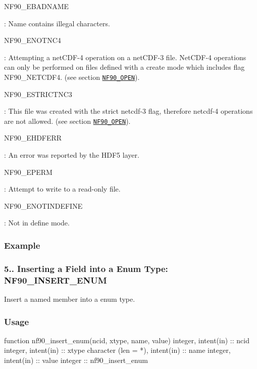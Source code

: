 {\ttfamily N\+F90\+\_\+\+E\+B\+A\+D\+N\+A\+ME}

\+: Name contains illegal characters.

{\ttfamily N\+F90\+\_\+\+E\+N\+O\+T\+N\+C4}

\+: Attempting a net\+C\+D\+F-\/4 operation on a net\+C\+D\+F-\/3 file. Net\+C\+D\+F-\/4 operations can only be performed on files defined with a create mode which includes flag N\+F90\+\_\+\+N\+E\+T\+C\+D\+F4. (see section \href{#NF90_005fOPEN}{\tt N\+F90\+\_\+\+O\+P\+EN}).

{\ttfamily N\+F90\+\_\+\+E\+S\+T\+R\+I\+C\+T\+N\+C3}

\+: This file was created with the strict netcdf-\/3 flag, therefore netcdf-\/4 operations are not allowed. (see section \href{#NF90_005fOPEN}{\tt N\+F90\+\_\+\+O\+P\+EN}).

{\ttfamily N\+F90\+\_\+\+E\+H\+D\+F\+E\+RR}

\+: An error was reported by the H\+D\+F5 layer.

{\ttfamily N\+F90\+\_\+\+E\+P\+E\+RM}

\+: Attempt to write to a read-\/only file.

{\ttfamily N\+F90\+\_\+\+E\+N\+O\+T\+I\+N\+D\+E\+F\+I\+NE}

\+: Not in define mode.

\subsubsection*{Example}\hypertarget{f90-user-defined-data-types_f90-inserting-a-field-into-a-enum-type-nf90_insert_enum}{}\subsubsection{5.. Inserting a Field into a Enum Type\+: N\+F90\+\_\+\+I\+N\+S\+E\+R\+T\+\_\+\+E\+N\+UM}\label{f90-user-defined-data-types_f90-inserting-a-field-into-a-enum-type-nf90_insert_enum}
Insert a named member into a enum type.

\subsubsection*{Usage}


\begin{DoxyCode}
\textcolor{keyword}{function }nf90\_insert\_enum(ncid, xtype, name, value)
  \textcolor{keywordtype}{integer}, \textcolor{keywordtype}{intent(in)} :: ncid
  \textcolor{keywordtype}{integer}, \textcolor{keywordtype}{intent(in)} :: xtype
  \textcolor{keywordtype}{character (len = *)}, \textcolor{keywordtype}{intent(in)} :: name
  \textcolor{keywordtype}{integer}, \textcolor{keywordtype}{intent(in)} :: value
  \textcolor{keywordtype}{integer} :: nf90\_insert\_enum
\end{DoxyCode}



